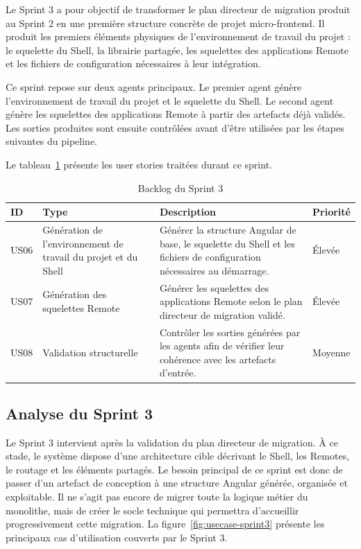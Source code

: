 Le Sprint 3 a pour objectif de transformer le plan directeur de migration produit au Sprint 2 en une première structure concrète de projet micro-frontend. Il produit les premiers éléments physiques de l'environnement de travail du projet : le squelette du Shell, la librairie partagée, les squelettes des applications Remote et les fichiers de configuration nécessaires à leur intégration.

Ce sprint repose sur deux agents principaux. Le premier agent génère l'environnement de travail du projet et le squelette du Shell. Le second agent génère les squelettes des applications Remote à partir des artefacts déjà validés. Les sorties produites sont ensuite contrôlées avant d'être utilisées par les étapes suivantes du pipeline.

Le tableau~\ref{tab:backlog-sprint3-release1} présente les user stories traitées durant ce sprint.

\begingroup
\renewcommand{\arraystretch}{1.12}
\setlength{\tabcolsep}{4pt}
\begin{longtable}{|p{1.0cm}|p{3.5cm}|p{6.9cm}|p{1.15cm}|}
\caption{Backlog du Sprint 3}\label{tab:backlog-sprint3-release1}\\
\hline
\textbf{ID} & \textbf{Type} & \textbf{Description} & \textbf{Priorité} \\
\hline
US06 & Génération de l'environnement de travail du projet et du Shell & Générer la structure Angular de base, le squelette du Shell et les fichiers de configuration nécessaires au démarrage. & Élevée \\
\hline
US07 & Génération des squelettes Remote & Générer les squelettes des applications Remote selon le plan directeur de migration validé. & Élevée \\
\hline
US08 & Validation structurelle & Contrôler les sorties générées par les agents afin de vérifier leur cohérence avec les artefacts d'entrée. & Moyenne \\
\hline
\end{longtable}
\endgroup

\subsection{Analyse du Sprint 3}

Le Sprint 3 intervient après la validation du plan directeur de migration. À ce stade, le système dispose d'une architecture cible décrivant le Shell, les Remotes, le routage et les éléments partagés. Le besoin principal de ce sprint est donc de passer d'un artefact de conception à une structure Angular générée, organisée et exploitable. Il ne s'agit pas encore de migrer toute la logique métier du monolithe, mais de créer le socle technique qui permettra d'accueillir progressivement cette migration. La figure~\ref{fig:usecase-sprint3} présente les principaux cas d'utilisation couverts par le Sprint 3.


